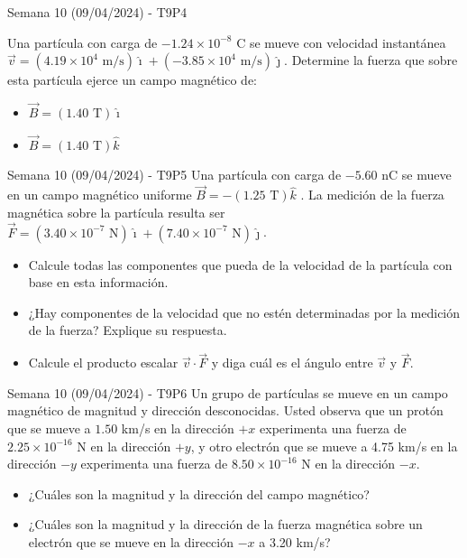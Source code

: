 \begin{frame}{Semana 10 (09/04/2024) - T9P4}
    
    Una partícula con carga de $-1.24 \times10^{-8}$ C se mueve con
velocidad instantánea $\vec{v}= (4.19 \times 10^4 \text{ m/s})\hat{\imath} + (-3.85 \times 10^4 \text{ m/s})\hat{\jmath}$.
Determine la fuerza que sobre esta partícula ejerce un campo magnético de:
\begin{itemize}
    \item[a)] $\vec{B} = (1.40 \text{ T})\hat{\imath}$
    \item[b)] $\vec{B} = (1.40 \text{ T})\hat{k}$
\end{itemize}
    
\end{frame}

\begin{frame}{Semana 10 (09/04/2024) - T9P5}
    Una partícula con carga de $-5.60$ nC se mueve en un
campo magnético uniforme $\vec{B}=-(1.25 \text{ T})\hat{k}$ . La medición de la fuerza magnética sobre la partícula resulta ser $\vec{F}=(3.40 \times 10^{-7} \text{ N})\hat{\imath} + (7.40 \times 10^{-7} \text{ N})\hat{\jmath}$.

\begin{itemize}
    \item[a)] Calcule todas las componentes que pueda de la velocidad de la partícula con base en esta información.
    \item[b)] ¿Hay componentes de la velocidad que no estén determinadas por la medición 
de la fuerza? Explique su respuesta.
    \item[c)] Calcule el producto escalar $\vec{v}\cdot\vec{F}$ y diga cuál es el ángulo entre $\vec{v}$ y $\vec{F}$.
\end{itemize}
\end{frame}

\begin{frame}{Semana 10 (09/04/2024) - T9P6}
    Un grupo de partículas se mueve en un campo magnético de magnitud y dirección desconocidas. Usted observa que un protón
que se mueve a $1.50$ km/s en la dirección $+x$ experimenta una fuerza
de $2.25 \times 10^{-16}$ N en la dirección $+y$, y otro electrón que se mueve a
4.75 km/s en la dirección $-y$ experimenta una fuerza de $8.50 \times 10^{-16}$ N
en la dirección $-x$.
\begin{itemize}
    \item[a)] ¿Cuáles son la magnitud y la dirección del
campo magnético?
    \item[b)] ¿Cuáles son la magnitud y la dirección de la
fuerza magnética sobre un electrón que se mueve en la dirección $-x$
a 3.20 km/s?
\end{itemize}
\end{frame}

